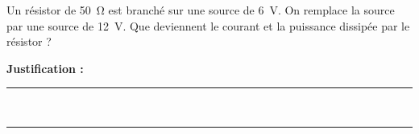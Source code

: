 Un résistor de \qty{50}{\ohm} est branché sur une source de \qty{6}{V}. On remplace la source par une source de \qty{12}{V}. Que deviennent le courant et la puissance dissipée par le résistor ?

\choices

\noindent\textbf{Justification :} \hrulefill \\[2.5ex]
\rule{\linewidth}{0.4pt} \\[2.5ex]
\rule{\linewidth}{0.4pt}
\vfill
